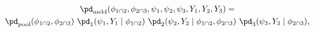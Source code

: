 \begin{multline}
  \pd_{\text{meld}} (\phi_{1 \cap 2}, \phi_{2 \cap 3}, \psi_{1}, \psi_{2}, \psi_{3}, Y_{1}, Y_{2}, Y_{3}) = \\    
    \pd_{\text{pool}}(\phi_{1 \cap 2}, \phi_{2 \cap 3}) \,\,
    \pd_{1} (\psi_{1}, Y_{1} \mid \phi_{1 \cap 2}) \,\,
    \pd_{2} (\psi_{2}, Y_{2} \mid \phi_{1 \cap 2}, \phi_{2 \cap 3}) \,\,
    \pd_{3} (\psi_{3}, Y_{3} \mid \phi_{2 \cap 3}),
  \label{eqn:melded-model-cond}
\end{multline}